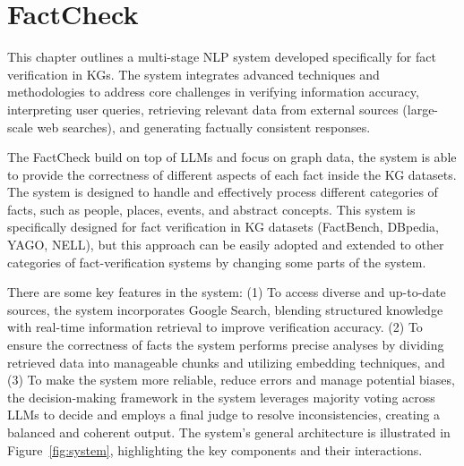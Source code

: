 \chapter{FactCheck}\label{ch:system}
This chapter outlines a multi-stage NLP system developed specifically for fact verification in \acp{KG}.
The system integrates advanced techniques and methodologies to address core challenges in verifying information accuracy, interpreting user queries, retrieving relevant data from external sources (\eg large-scale web searches), and generating factually consistent responses.

The FactCheck build on top of \acp{LLM} and focus on graph data, the system is able to provide the correctness of different aspects of each fact inside the \ac{KG} datasets.
The system is designed to handle and effectively process different categories of facts, such as people, places, events, and abstract concepts.
This system is specifically designed for fact verification in \ac{KG} datasets (\eg FactBench, DBpedia, YAGO, NELL), but this approach can be easily adopted and extended to other categories of fact-verification systems by changing some parts of the system.

There are some key features in the system:
(1) To access diverse and up-to-date sources, the system incorporates Google Search, blending structured knowledge with real-time information retrieval to improve verification accuracy.
(2) To ensure the correctness of facts the system performs precise analyses by dividing retrieved data into manageable chunks and utilizing embedding techniques,
and (3) To make the system more reliable, reduce errors and manage potential biases, the decision-making framework in the system leverages majority voting across \acp{LLM} to decide and employs a final judge to resolve inconsistencies, creating a balanced and coherent output.
\newpage
The system's general architecture is illustrated in Figure~\ref{fig:system}, highlighting the key components and their interactions.


